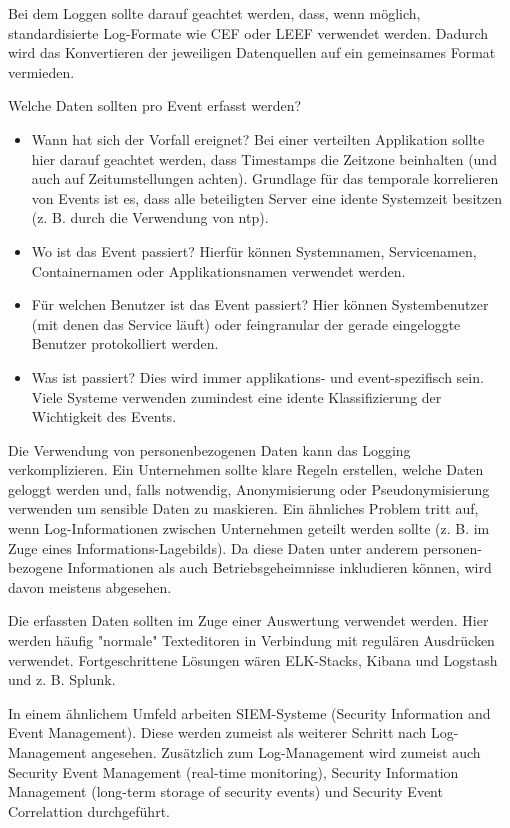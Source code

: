 Bei dem Loggen sollte darauf geachtet werden, dass, wenn möglich, standardisierte Log-Formate wie CEF oder LEEF verwendet werden. Dadurch wird das Konvertieren der jeweiligen Datenquellen auf ein gemeinsames Format vermieden.

Welche Daten sollten pro Event erfasst werden?

\begin{itemize}
	\item Wann hat sich der Vorfall ereignet? Bei einer verteilten Applikation sollte hier darauf geachtet werden, dass Timestamps die Zeitzone beinhalten (und auch auf Zeitumstellungen achten). Grundlage für das temporale korrelieren von Events ist es, dass alle beteiligten Server eine idente Systemzeit besitzen (z. B. durch die Verwendung von ntp).
	\item Wo ist das Event passiert? Hierfür können Systemnamen, Servicenamen, Containernamen oder Applikationsnamen verwendet werden.
	\item Für welchen Benutzer ist das Event passiert? Hier können Systembenutzer (mit denen das Service läuft) oder feingranular der gerade eingeloggte Benutzer protokolliert werden.
	\item Was ist passiert? Dies wird immer applikations- und event-spezifisch sein. Viele Systeme verwenden zumindest eine idente Klassifizierung der Wichtigkeit des Events.
\end{itemize}

Die Verwendung von personenbezogenen Daten kann das Logging verkomplizieren. Ein Unternehmen sollte klare Regeln erstellen, welche Daten geloggt werden und, falls notwendig, Anonymisierung oder Pseudonymisierung verwenden um sensible Daten zu maskieren. Ein ähnliches Problem tritt auf, wenn Log-Informationen zwischen Unternehmen geteilt werden sollte (z. B. im Zuge eines Informations-Lagebilds). Da diese Daten unter anderem personen-bezogene Informationen als auch Betriebsgeheimnisse inkludieren können, wird davon meistens abgesehen.

Die erfassten Daten sollten im Zuge einer Auswertung verwendet werden. Hier werden häufig "normale" Texteditoren in Verbindung mit regulären Ausdrücken verwendet. Fortgeschrittene Lösungen wären ELK-Stacks, Kibana und Logstash und z. B. Splunk.

In einem ähnlichem Umfeld arbeiten SIEM-Systeme (Security Information and Event Management). Diese werden zumeist als weiterer Schritt nach Log-Management angesehen. Zusätzlich zum Log-Management wird zumeist auch Security Event Management (real-time monitoring), Security Information Management (long-term storage of security events) und Security Event Correlattion durchgeführt.

